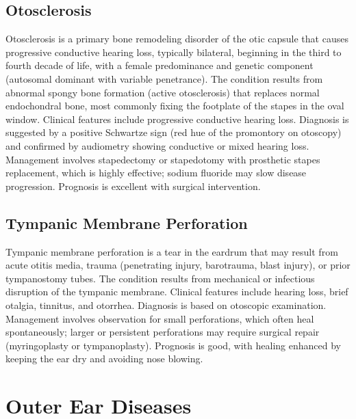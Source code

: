 \subsection{Otosclerosis}
\label{sec:Otosclerosis}
Otosclerosis is a primary bone remodeling disorder of the otic capsule that causes progressive conductive hearing loss, typically bilateral, beginning in the third to fourth decade of life, with a female predominance and genetic component (autosomal dominant with variable penetrance). The condition results from abnormal spongy bone formation (active otosclerosis) that replaces normal endochondral bone, most commonly fixing the footplate of the stapes in the oval window. Clinical features include progressive conductive hearing loss. Diagnosis is suggested by a positive Schwartze sign (red hue of the promontory on otoscopy) and confirmed by audiometry showing conductive or mixed hearing loss. Management involves stapedectomy or stapedotomy with prosthetic stapes replacement, which is highly effective; sodium fluoride may slow disease progression. Prognosis is excellent with surgical intervention.

\subsection{Tympanic Membrane Perforation}
\label{sec:Tympanic Membrane Perforation}
Tympanic membrane perforation is a tear in the eardrum that may result from acute otitis media, trauma (penetrating injury, barotrauma, blast injury), or prior tympanostomy tubes. The condition results from mechanical or infectious disruption of the tympanic membrane. Clinical features include hearing loss, brief otalgia, tinnitus, and otorrhea. Diagnosis is based on otoscopic examination. Management involves observation for small perforations, which often heal spontaneously; larger or persistent perforations may require surgical repair (myringoplasty or tympanoplasty). Prognosis is good, with healing enhanced by keeping the ear dry and avoiding nose blowing.

\section{Outer Ear Diseases}


